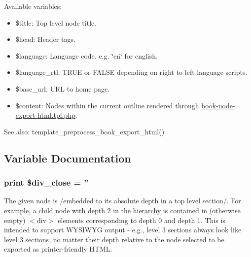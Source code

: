 Available variables:\begin{itemize}
\item \$title: Top level node title.\item \$head: Header tags.\item \$language: Language code. e.g. \char`\"{}en\char`\"{} for english.\item \$language\_\-rtl: TRUE or FALSE depending on right to left language scripts.\item \$base\_\-url: URL to home page.\item \$content: Nodes within the current outline rendered through \hyperlink{book-node-export-html_8tpl_8php}{book-node-export-html.tpl.php}.\end{itemize}


\begin{Desc}
\item[See also:]template\_\-preprocess\_\-book\_\-export\_\-html() \end{Desc}


\subsection{Variable Documentation}
\hypertarget{book-export-html_8tpl_8php_d7ca5cbbe327a2d37bf5ac15dc38efe0}{
\subsubsection[{\$div\_\-close}]{\setlength{\rightskip}{0pt plus 5cm}print \$div\_\-close = ''}}
\label{book-export-html_8tpl_8php_d7ca5cbbe327a2d37bf5ac15dc38efe0}


The given node is /embedded to its absolute depth in a top level section/. For example, a child node with depth 2 in the hierarchy is contained in (otherwise empty) $<$div$>$ elements corresponding to depth 0 and depth 1. This is intended to support WYSIWYG output - e.g., level 3 sections always look like level 3 sections, no matter their depth relative to the node selected to be exported as printer-friendly HTML. 